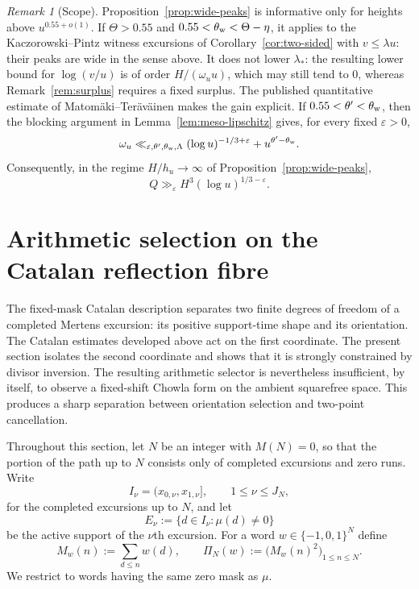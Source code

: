 \documentclass[11pt]{amsart}
\numberwithin{equation}{section}
\theoremstyle{plain}
\theoremstyle{definition}
\theoremstyle{remark}
\newtheorem{remark}[theorem]{Remark}
\begin{document}
\begin{remark}[Scope]
\label{rem:wide-peaks-scope}
Proposition~\ref{prop:wide-peaks} is informative only for heights above
$u^{0.55+o(1)}$. If $\Theta>0.55$ and $0.55<\theta_{\rm w}<\Theta-\eta$, it
applies to the Kaczorowski--Pintz witness excursions of
Corollary~\ref{cor:two-sided} with $v\le\lambda u$: their peaks are wide in
the sense above. It does not lower $\lambda_*$: the resulting lower bound
for $\log(v/u)$ is of order $H/(\omega_uu)$, which may still tend to $0$,
whereas Remark~\ref{rem:surplus} requires a fixed surplus. The published
quantitative estimate of Matom\"aki--Ter\"av\"ainen
\cite[Theorem~1.1]{MatomakiTeravainen2023} makes the gain explicit. If
$0.55<\theta'<\theta_{\rm w}$, then the blocking argument in
Lemma~\ref{lem:meso-lipschitz} gives, for every fixed $\varepsilon>0$,
\[
\omega_u\ll_{\varepsilon,\theta',\theta_{\rm w},\Lambda}
(\log u)^{-1/3+\varepsilon}+u^{\theta'-\theta_{\rm w}}.
\]
Consequently, in the regime $H/h_u\to\infty$ of
Proposition~\ref{prop:wide-peaks},
\[
Q\gg_{\varepsilon}H^3(\log u)^{1/3-\varepsilon}.
\]
\end{remark}




\section{Arithmetic selection on the Catalan reflection fibre}
\label{sec:arithmetic-selection-fibre}

The fixed-mask Catalan description separates two finite degrees of freedom of a completed Mertens excursion: its positive support-time shape and its orientation.  The Catalan estimates developed above act on the first coordinate.  The present section isolates the second coordinate and shows that it is strongly constrained by divisor inversion.  The resulting arithmetic selector is nevertheless insufficient, by itself, to observe a fixed-shift Chowla form on the ambient squarefree space.  This produces a sharp separation between orientation selection and two-point cancellation.

Throughout this section, let $N$ be an integer with $M(N)=0$, so that the portion of the path up to $N$ consists only of completed excursions and zero runs.  Write
\[
I_\nu=(x_{0,\nu},x_{1,\nu}],\qquad 1\le \nu\le J_N,
\]
for the completed excursions up to $N$, and let
\[
E_\nu:=\{d\in I_\nu:\mu(d)\ne0\}
\]
be the active support of the $\nu$th excursion.  For a word $w\in\{-1,0,1\}^N$ define
\[
M_w(n):=\sum_{d\le n}w(d),\qquad
\Pi_N(w):=\bigl(M_w(n)^2\bigr)_{1\le n\le N}.
\]
We restrict to words having the same zero mask as $\mu$.
\end{document}
